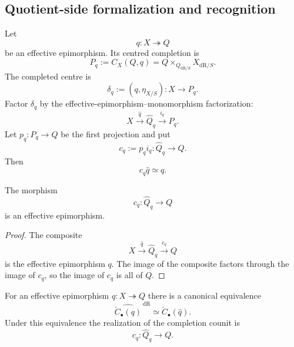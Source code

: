 \subsection{Quotient-side formalization and recognition}

\begin{definition}
\label{def:quotient-formalization}
Let
\[
    q:X\twoheadrightarrow Q
\]
be an effective epimorphism.  Its centred completion is
\[
    P_q
    :=
    C_X(Q,q)
    =
    Q\times_{Q_{\mathrm{dR}/S}}X_{\mathrm{dR}/S}.
\]
The completed centre is
\[
    \delta_q
    :=
    (q,\eta_{X/S}):
    X\longrightarrow P_q.
\]
Factor $\delta_q$ by the effective-epimorphism--monomorphism factorization:
\[
    X
    \xrightarrow{\widehat q}
    \widehat Q_q
    \xrightarrow{i_q}
    P_q.
\]
Let $p_q:P_q\to Q$ be the first projection and put
\[
    c_q
    :=
    p_qi_q:
    \widehat Q_q\longrightarrow Q.
\]
Then
\[
    c_q\widehat q\simeq q.
\]
\end{definition}

\begin{lemma}
\label{lem:quotient-formalization-effective}
The morphism
\[
    c_q:\widehat Q_q\longrightarrow Q
\]
is an effective epimorphism.
\end{lemma}

\begin{proof}
The composite
\[
    X\xrightarrow{\widehat q}\widehat Q_q
      \xrightarrow{c_q}Q
\]
is the effective epimorphism $q$.  The image of the composite factors through
the image of $c_q$, so the image of $c_q$ is all of $Q$.
\end{proof}

\begin{theorem}
\label{thm:quotient-formula-unitwise-completion}
For an effective epimorphism $q:X\twoheadrightarrow Q$ there is a canonical
equivalence
\[
    \widehat{\check C_\bullet(q)}^{\,\mathrm{dR}}
    \simeq
    \check C_\bullet(\widehat q).
\]
Under this equivalence the realization of the completion counit is
\[
    c_q:\widehat Q_q\longrightarrow Q.
\]
\end{theorem}

